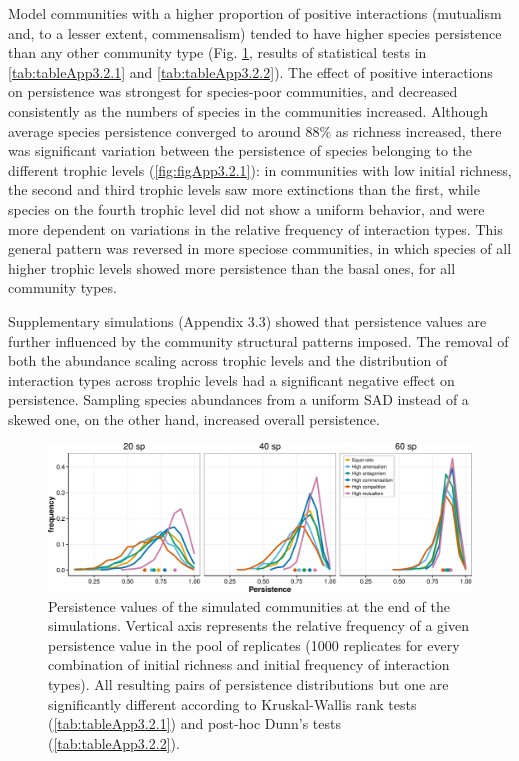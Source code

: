 Model communities with a higher proportion of positive interactions (mutualism and, to a lesser extent, commensalism) tended to have higher species persistence than any other community type (Fig. \ref{fig:fig3.2}, results of statistical tests in \cref{tab:tableApp3.2.1} and \cref{tab:tableApp3.2.2}). The effect of positive interactions on persistence was strongest for species-poor communities, and decreased consistently as the numbers of species in the communities increased. Although average species persistence converged to around 88\% as richness increased, there was significant variation between the persistence of species belonging to the different trophic levels (\cref{fig:figApp3.2.1}): in communities with low initial richness, the second and third trophic levels saw more extinctions than the first, while species on the fourth trophic level did not show a uniform behavior, and were more dependent on variations in the relative frequency of interaction types. This general pattern was reversed in more speciose communities, in which species of all higher trophic levels showed more persistence than the basal ones, for all community types.

Supplementary simulations (Appendix 3.3) showed that persistence values are further influenced by the community structural patterns imposed. The removal of both the abundance scaling across trophic levels and the distribution of interaction types across trophic levels had a significant negative effect on persistence. Sampling species abundances from a uniform SAD instead of a skewed one, on the other hand, increased overall persistence.

\begin{figure}[!ht]
\centering
\includegraphics[width=\textwidth]{./Figures/chapter03/Fig_2.png}
\caption[Persistence of model communities]{\color{Gray} Persistence values of the simulated communities at the end of the simulations. Vertical axis represents the relative frequency of a given persistence value in the pool of replicates (1000 replicates for every combination of initial richness and initial frequency of interaction types). All resulting pairs of persistence distributions but one are significantly different according to Kruskal-Wallis rank tests (\cref{tab:tableApp3.2.1}) and post-hoc Dunn’s tests (\cref{tab:tableApp3.2.2}).}
\label{fig:fig3.2}
\end{figure}

